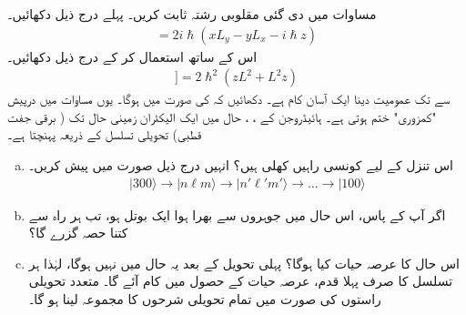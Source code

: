 مساوات      میں دی گئی  مقلوبی  رشتہ ثابت کریں۔   پہلے درج ذیل دکھائیں۔
\begin{align*}
	[L^2, z] = 2i\hslash(xL_y-yL_x-i\hslash z)
\end{align*}
اس  کے ساتھ    استعمال کر کے درج ذیل دکھائیں۔
\begin{align*}
[L^2, [L^2, z]] = 2\hslash^2(zL^2+L^2z)	
\end{align*}
 سے  تک عمومیت دینا  ایک آسان کام ہے۔
دکھائیں کہ  کی صورت میں  ہوگا۔  یوں مساوات   میں درپیش  "کمزوری"   ختم ہوتی ہے۔
ہائیڈروجن کے ،  ،    حال میں ایک الیکٹران زمینی حال تک ( برقی جفت قطبی)  تحویلی تسلسل  کے ذریعہ  پہنچتا ہے۔
\begin{enumerate}[a.]
\item
 اس تنزل کے لیے کونسی راہیں کھلی ہیں؟ انہیں درج ذیل صورت میں پیش کریں۔
\begin{align*}
	|300\rangle\to | n\ell m\rangle\to | n'\ell'm'\rangle\to\dots\to|100\rangle
\end{align*}
\item
 اگر آپ کے پاس،   اس حال میں جوہروں سے بھرا ہوا   ایک بوتل ہو،  تب ہر راہ  سے کتنا حصہ گزرے گا؟
\item
 اس حال کا عرصہ حیات کیا ہوگا؟    پہلی تحویل کے بعد یہ حال  میں نہیں ہوگا،  لہٰذا ہر  تسلسل   کا    صرف پہلا قدم،  عرصہ حیات  کے حصول میں کام آئے گا۔ متعدد تحویلی  راستوں کی صورت میں تمام تحویلی شرحوں  کا مجموعہ لینا ہو گا۔
 \end{enumerate}

